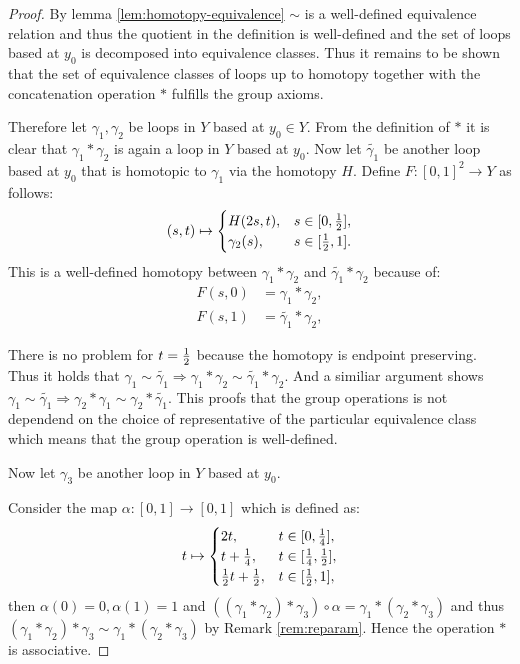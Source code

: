 \documentclass[a4paper, 11pt, twoside]{article}
\theoremstyle{break}
\theoremstyle{break}
\begin{document}
\begin{proof}
  By lemma \ref{lem:homotopy-equivalence} $\sim$ is a well-defined equivalence relation and thus the quotient in the definition is well-defined and the set of loops based at $y_0$ is decomposed into equivalence classes.
  Thus it remains to be shown that the set of equivalence classes of loops up to homotopy together with the concatenation operation $*$ fulfills the group axioms.

  Therefore let $\gamma_1, \gamma_2$ be loops in $Y$ based at $y_0 \in Y$. From the definition of $*$ it is clear that $\gamma_1 * \gamma_2$ is again a loop in $Y$ based at $y_0$.
  Now let $\tilde{\gamma_1}$ be another loop based at $y_0$ that is homotopic to $\gamma_1$ via the homotopy $H$. Define $F: [0,1]^2 \to Y$ as follows:
  \begin{equation*}
    (s, t) \mapsto \begin{cases}
      H(2s, t), &s \in [0,{1 \over 2}], \\
      \gamma_2(s), &s \in [{1 \over 2}, 1].
    \end{cases}
  \end{equation*}
  This is a well-defined homotopy between $\gamma_1 * \gamma_2$ and $\tilde{\gamma_1} * \gamma_2$ because of:
  \begin{align*}
    F(s, 0) &= \gamma_1 * \gamma_2, \\
    F(s, 1) &= \tilde{\gamma_1} * \gamma_2,
  \end{align*}
  
  There is no problem for $t = {1 \over 2}$ because the homotopy is endpoint preserving. Thus it holds that $\gamma_1 \sim \tilde{\gamma_1} \Rightarrow \gamma_1 * \gamma_2 \sim \tilde{\gamma_1} * \gamma_2$.
  And a similiar argument shows $\gamma_1 \sim \tilde{\gamma_1} \Rightarrow \gamma_2 * \gamma_1 \sim  \gamma_2 * \tilde{\gamma_1}$. 
  This proofs that the group operations is not dependend on the choice of representative of the particular equivalence class which means that the group operation is well-defined.

  Now let $\gamma_3$ be another loop in $Y$ based at $y_0$. 

  Consider the map $\alpha: [0,1] \to [0,1]$ which is defined as:
  \begin{equation*}
    t \mapsto \begin{cases}
      2t, &t \in [0, {1 \over 4}], \\
      t + {1 \over 4}, &t \in [{1\over4}, {1\over2}], \\
      {1\over2}t + {1\over2}, &t\in[{1\over2}, 1],
    \end{cases}
  \end{equation*}
  then $\alpha(0) = 0, \alpha(1) = 1$ and $((\gamma_1 * \gamma_2) * \gamma_3) \circ \alpha = \gamma_1 * (\gamma_2 * \gamma_3)$ and thus $(\gamma_1 * \gamma_2) * \gamma_3 \sim \gamma_1 * (\gamma_2 * \gamma_3)$ by Remark \ref{rem:reparam}.
  Hence the operation $*$ is associative.
  


\end{proof}
\end{document}
